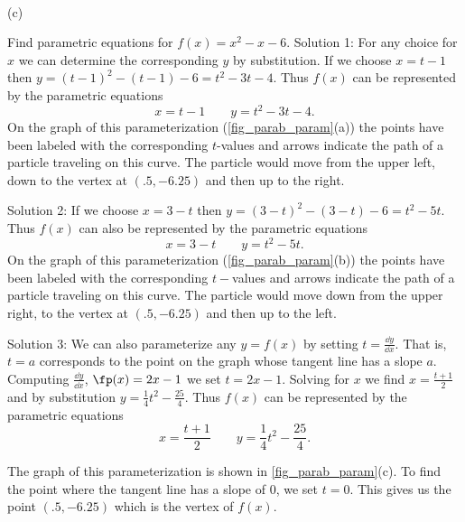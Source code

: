 {
\\(c)}

\begin{example}\label{ex_pareq5}
Find parametric equations for $f(x)=x^2-x-6$.
\solution
Solution 1: For any choice for $x$ we can determine the corresponding $y$ by substitution. If we choose $x=t-1$ then $y=(t-1)^2-(t-1)-6=t^2-3t-4$. Thus $f(x)$ can be represented by the parametric equations
\[x=t-1 \qquad y=t^2-3t-4.\]
On the graph of this parameterization (\autoref{fig_parab_param}(a)) the points have been labeled with the corresponding $t$-values and arrows indicate the path of a particle traveling on this curve. The particle would move from the upper left, down to the vertex at $(.5,-6.25)$ and then up to the right.

Solution 2: If we choose $x=3-t$ then $y=(3-t)^2-(3-t)-6=t^2-5t$. Thus $f(x)$ can also be represented by the parametric equations
\[x=3-t \qquad y=t^2-5t.\]
On the graph of this parameterization (\autoref{fig_parab_param}(b)) the points have been labeled with the corresponding $t-$values and arrows indicate the path of a particle traveling on this curve. The particle would move down from the upper right, to the vertex at $(.5,-6.25)$ and then up to the left.

Solution 3: We can also parameterize any $y=f(x)$ by setting $t=\frac{\dd y}{\dd x}$. That is, $t=a$ corresponds to the point on the graph whose tangent line has a slope $a$. Computing $\frac{\dd y}{\dd x}$, $\fp(x) = 2x-1$ we set $t=2x-1$. Solving for $x$ we find $x=\frac{t+1}{2}$ and by substitution $y=\frac{1}{4}t^2 - \frac{25}{4}$. Thus $f(x)$ can be represented by the parametric equations
\[x=\frac{t+1}{2} \qquad y=\frac{1}{4}t^2 - \frac{25}{4}.\]

The graph of this parameterization is shown in \autoref{fig_parab_param}(c). To find the point where the tangent line has a slope of $0$, we set $t=0$. This gives us the point $(.5, -6.25)$ which is the vertex of $f(x)$.
\end{example}

